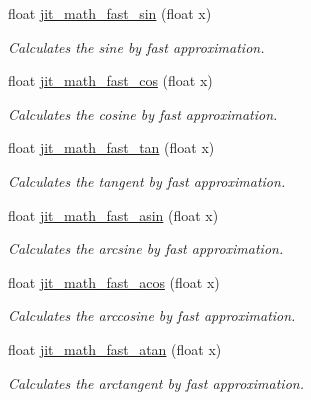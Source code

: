 \begin{DoxyCompactItemize}
float \hyperlink{group__mathmod_gaaa6b6cb9d099ef000e3c6c5f57b0ea92}{jit\_\-math\_\-fast\_\-sin} (float x)
\begin{DoxyCompactList}\small\item\em Calculates the sine by fast approximation. \item\end{DoxyCompactList}\item 
float \hyperlink{group__mathmod_ga3bd3eccee538a638fd6e16fef0556c9b}{jit\_\-math\_\-fast\_\-cos} (float x)
\begin{DoxyCompactList}\small\item\em Calculates the cosine by fast approximation. \item\end{DoxyCompactList}\item 
float \hyperlink{group__mathmod_gaf78d2726613e3785b5aa28e7b6cfb0d7}{jit\_\-math\_\-fast\_\-tan} (float x)
\begin{DoxyCompactList}\small\item\em Calculates the tangent by fast approximation. \item\end{DoxyCompactList}\item 
float \hyperlink{group__mathmod_ga23a4fa4d02d54526c8fb052100ce107e}{jit\_\-math\_\-fast\_\-asin} (float x)
\begin{DoxyCompactList}\small\item\em Calculates the arcsine by fast approximation. \item\end{DoxyCompactList}\item 
float \hyperlink{group__mathmod_gace1fc2c392478cb1e2b446b49413bc8c}{jit\_\-math\_\-fast\_\-acos} (float x)
\begin{DoxyCompactList}\small\item\em Calculates the arccosine by fast approximation. \item\end{DoxyCompactList}\item 
float \hyperlink{group__mathmod_gaa95fba05813219b708f225c68d0130ed}{jit\_\-math\_\-fast\_\-atan} (float x)
\begin{DoxyCompactList}\small\item\em Calculates the arctangent by fast approximation. \item\end{DoxyCompactList}\end{DoxyCompactItemize}


